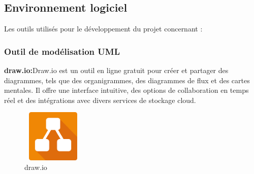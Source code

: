 \documentclass[edit,12pt,a4paper,ChapStyle,oneside,doubleinterligne]{report}
\begin{document}
\subsection{Environnement logiciel }
Les outils utilisés pour le développement du projet concernant :
\subsubsection{ Outil de modélisation UML }
\textbf{draw.io:}Draw.io est un outil en ligne gratuit pour créer et partager des diagrammes, tels que des organigrammes, des diagrammes de flux et des cartes mentales. Il offre une interface intuitive, des options de collaboration en temps réel et des intégrations avec divers services de stockage cloud.\cite{drawio}
\begin{figure}[H]\label{fig:draw.io}
    \centering
    \includegraphics[width=3cm , height = 2.5cm , angle=360]{images/drawio.png}
    \caption{draw.io}
    \end{figure}
\end{document}
